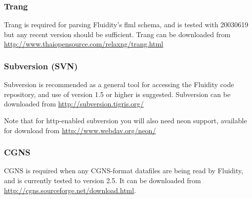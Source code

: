 \subsubsection{Trang}
\label{sect:required_libraries_supporting_trang}

Trang is required for parsing Fluidity's flml schema, and is tested with
20030619 but any recent version should be sufficient. Trang can be downloaded
from \url{http://www.thaiopensource.com/relaxng/trang.html}

\subsubsection{Subversion (SVN)}
\label{sect:required_libraries_supportingsvn}

Subversion is recommended as a general tool for accessing the Fluidity code
repository, and use of version 1.5 or higher is suggested. Subversion can be
downloaded from \url{http://subversion.tigris.org/}

Note that for http-enabled subversion you will also need neon support,
available for download from \url{http://www.webdav.org/neon/}

\subsubsection{CGNS}
\label{sect:required_libraries_supporting_cgns}

CGNS is required when any CGNS-format datafiles are being read by Fluidity, and
is currently tested to version 2.5. It can be downloaded from 
\url{http://cgns.sourceforge.net/download.html}.
